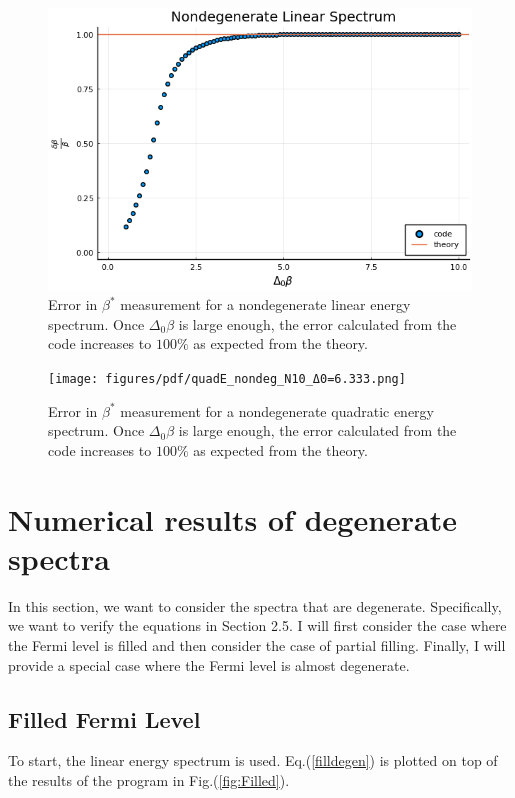 \begin{figure}[H]
    \centering
    \includegraphics[scale=0.5]{figures/pdf/linE_nondeg.png}
    \caption{Error in $\beta^*$ measurement for a nondegenerate linear energy spectrum. Once $\Delta_0\beta$ is large enough, the error calculated from the code increases to $100\%$ as expected from the theory. }
    \label{fig:linnondeg}
\end{figure}

\begin{figure}[H]
    \centering
    \texttt{[image: figures/pdf/quadE\_nondeg\_N10\_Δ0=6.333.png]}
    \caption{Error in $\beta^*$ measurement for a nondegenerate quadratic energy spectrum. Once $\Delta_0\beta$ is large enough, the error calculated from the code increases to $100\%$ as expected from the theory. }
    \label{fig:quadnondeg}
\end{figure}


\section{Numerical results of degenerate spectra}
In this section, we want to consider the spectra that are degenerate. Specifically, we want to verify the equations in Section 2.5. I will first consider the case where the Fermi level is filled and then consider the case of partial filling. Finally, I will provide a special case where the Fermi level is almost degenerate. 
\subsection{Filled Fermi Level}
To start, the linear energy spectrum is used. Eq.\@ (\ref{filldegen}) is plotted on top of the results of the program in Fig.\@ (\ref{fig:Filled}).  

